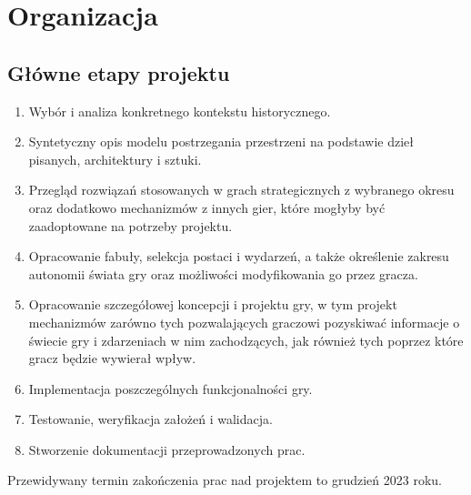\chapter{Organizacja}
\section{Główne etapy projektu}
\begin{enumerate}
  \item Wybór i analiza konkretnego kontekstu historycznego.
  \item Syntetyczny opis modelu postrzegania przestrzeni na podstawie dzieł pisanych, architektury i sztuki.
  \item Przegląd rozwiązań stosowanych w grach strategicznych z wybranego okresu oraz dodatkowo mechanizmów z innych gier, które mogłyby być zaadoptowane na potrzeby projektu.
  \item Opracowanie fabuły, selekcja postaci i wydarzeń, a także określenie zakresu autonomii świata gry oraz możliwości modyfikowania go przez gracza.
  \item Opracowanie szczegółowej koncepcji i projektu gry, w tym projekt mechanizmów zarówno tych pozwalających graczowi pozyskiwać informacje o świecie gry i zdarzeniach w nim zachodzących, jak również tych poprzez które gracz będzie wywierał wpływ.
  \item Implementacja poszczególnych funkcjonalności gry.
  \item Testowanie, weryfikacja założeń i walidacja.
  \item Stworzenie dokumentacji przeprowadzonych prac.
\end{enumerate}
Przewidywany termin zakończenia prac nad projektem to grudzień 2023 roku.
